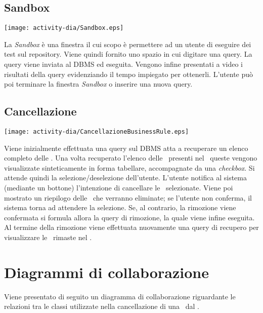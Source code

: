 \subsection{Sandbox}
\begin{center}
 \texttt{[image: activity-dia/Sandbox.eps]}
\end{center}
La \textit{Sandbox} \`e una finestra il cui scopo \`e permettere ad un utente di eseguire dei test sul repository. Viene quindi fornito uno spazio in cui digitare una query. La query viene inviata al DBMS ed eseguita. Vengono infine presentati a video i risultati della query evidenziando il tempo impiegato per ottenerli. L'utente pu\`o poi terminare la finestra \textit{Sandbox} o inserire una nuova query.

\subsection{Cancellazione \br}
\begin{center}
 \texttt{[image: activity-dia/CancellazioneBusinessRule.eps]}
\end{center}
Viene inizialmente effettuata una query sul DBMS atta a recuperare un elenco completo delle \brs. Una volta recuperato l'elenco delle \brs\ presenti nel \rp\ queste vengono visualizzate sinteticamente in forma tabellare, accompagnate da una \textit{checkbox}. Si attende quindi la selezione/deselezione dell'utente. L'utente notifica al sistema (mediante un bottone) l'intenzione di cancellare le \brs\ selezionate.  Viene poi mostrato un riepilogo delle \brs\ che verranno eliminate; se l'utente non conferma, il sistema torna ad attendere la selezione. Se, al contrario, la rimozione viene confermata si formula allora la query di rimozione, la quale viene infine eseguita. Al termine della rimozione viene effettuata nuovamente una query di recupero per visualizzare le \brs\ rimaste nel \rp.

\section{Diagrammi di collaborazione}
Viene presentato di seguito un diagramma di collaborazione riguardante le relazioni tra le classi utilizzate nella cancellazione di una \br\ dal \rp.

